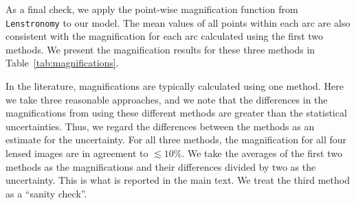 
As a final check, we apply the point-wise magnification function from \texttt{Lenstronomy} to our model. The mean values of all points within each arc are also consistent with the magnification for each arc calculated using the first two methods. We present the magnification results for these three methods in Table~\ref{tab:magnifications}.



In the literature, magnifications are typically calculated using one method. 
Here we take three reasonable approaches, and we note that the differences in the magnifications from using these different methods are greater than the statistical uncertainties. Thus, we regard the differences between the methods as an estimate for the uncertainty. For all three methods, the magnification for all four lensed images are in agreement to $\lesssim 10\%$. 
We take the averages of the first two methods as the magnifications and their differences divided by two as the uncertainty. This is what is reported in the main text.
We treat the third method as a ``sanity check''.





